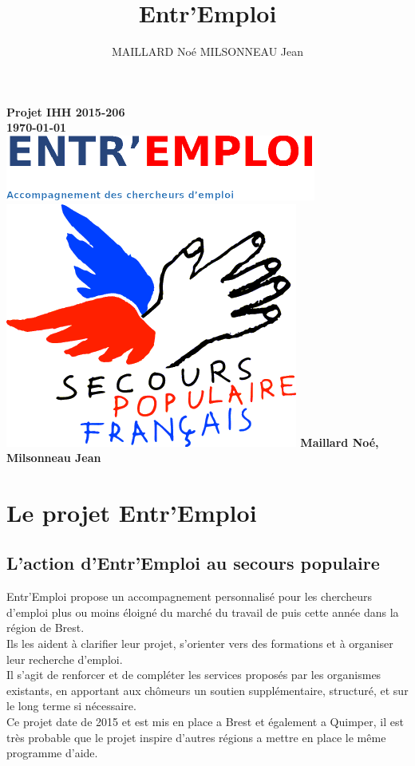 \documentclass[12pt]{report}
\title{Entr'Emploi}
\author{MAILLARD Noé MILSONNEAU Jean}
\begin{document}
\begin{titlepage}
    \centering
    {\bfseries\Large
        Projet IHH 2015-206\\
        \today\\
        \vskip3cm
        \includegraphics{../../public/images/Logo-entremploi-md.png}
        \vskip15mm
        \includegraphics{../../public/images/Logo-spf.png}
        \vskip3cm
        Maillard Noé, Milsonneau Jean\\
    }    
    \normalsize
\end{titlepage}

\tableofcontents

 
\chapter{Le projet Entr'Emploi}
\section{L'action d'Entr'Emploi au secours populaire}
Entr'Emploi propose un accompagnement personnalisé pour les chercheurs d'emploi plus ou moins éloigné du marché du travail de puis cette année dans la région de Brest.\\
Ils les aident à clarifier leur projet, s'orienter vers des formations et à organiser leur recherche d'emploi.\\
Il s'agit de renforcer et de compléter les services proposés par les organismes existants, en apportant aux chômeurs un soutien supplémentaire, structuré, et sur le long terme si nécessaire.\\
Ce projet date de 2015 et est mis en place a Brest et également a Quimper, il est très probable que le projet inspire d'autres régions a mettre en place le même programme d'aide.
\end{document}
